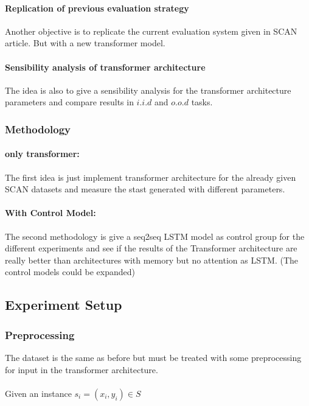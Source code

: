 \documentclass[]{article}
\begin{document}
\paragraph*{Replication of previous evaluation strategy}
Another objective is to replicate the current evaluation system given in SCAN article. But with a new transformer model.

\paragraph*{Sensibility analysis of transformer architecture}
The idea is also to give a sensibility analysis for the transformer architecture parameters and compare results in $i.i.d$ and $o.o.d$ tasks.

\subsubsection*{Methodology}
\paragraph*{only transformer:} The first idea is just implement transformer architecture for the already given SCAN datasets and measure the stast generated with different parameters.

\paragraph*{With Control Model:} The second methodology is give a seq2seq LSTM model as control group for the different experiments and see if the results of the Transformer architecture are really better than architectures with memory but no attention as LSTM. (The control models could be expanded)


\subsection{Experiment Setup}


\subsubsection*{Preprocessing}
The dataset is the same as before but must be treated with some preprocessing for input in the transformer architecture.

\paragraph*{}
Given an instance $s_i = (x_i, y_i) \in S$
\end{document}
